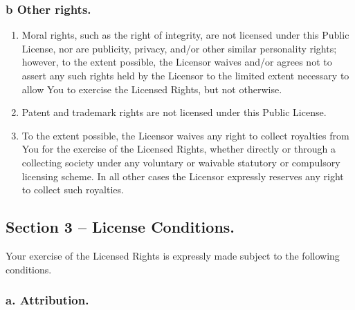 \documentclass[12pt,a4paper]{article}
\begin{document}
\subsubsection*{b Other rights.}

\begin{enumerate}
\setlength{\itemsep}{0cm}
\item Moral rights, such as the right of integrity, are not licensed under this Public License, nor are publicity, privacy, and/or other similar personality rights; however, to the extent possible, the Licensor waives and/or agrees not to assert any such rights held by the Licensor to the limited extent necessary to allow You to exercise the Licensed Rights, but not otherwise.
\item        Patent and trademark rights are not licensed under this Public License.
\item        To the extent possible, the Licensor waives any right to collect royalties from You for the exercise of the Licensed Rights, whether directly or through a collecting society under any voluntary or waivable statutory or compulsory licensing scheme. In all other cases the Licensor expressly reserves any right to collect such royalties.
\end{enumerate}

\subsection*{Section 3 – License Conditions.}

Your exercise of the Licensed Rights is expressly made subject to the following conditions.

\subsubsection*{a. Attribution.}
\end{document}
